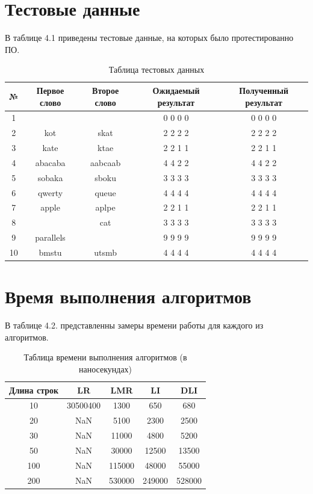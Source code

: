 \documentclass[12pt]{report}
\begin{document}
\section{Тестовые данные}

В таблице 4.1 приведены тестовые данные, на которых было протестированно ПО.

\begin{table}[h]
	\begin{center}
		\begin{tabular}{|c c c c c|} 
			\hline
			№ & Первое слово & Второе слово & Ожидаемый результат & Полученный результат \\ [0.8ex] 
			\hline
			1 &  &  & 0 0 0 0 & 0 0 0 0\\
			\hline
			2 & kot & skat & 2 2 2 2 & 2 2 2 2\\
			\hline
			3 & kate & ktae & 2 2 1 1 & 2 2 1 1\\
			\hline
			4 & abacaba & aabcaab & 4 4 2 2 & 4 4 2 2\\
			\hline
			5 & sobaka & sboku & 3 3 3 3 & 3 3 3 3\\
			\hline
			6 & qwerty & queue & 4 4 4 4 & 4 4 4 4\\
			\hline
			7 & apple & aplpe & 2 2 1 1  & 2 2 1 1\\
			\hline
			8 &  & cat & 3 3 3 3 & 3 3 3 3\\
			\hline
			9 & parallels &  & 9 9 9 9 & 9 9 9 9\\
			\hline
			10 & bmstu & utsmb & 4 4 4 4 & 4 4 4 4\\
			\hline
		\end{tabular}
		\caption{Таблица тестовых данных}
	\end{center}
\end{table}


\section{Время выполнения алгоритмов}

В таблице 4.2. представленны замеры времени работы для каждого из алгоритмов.
\begin{table} [h!]
	\begin{center}
		\begin{tabular}{|c c c c c|} 
		 	\hline
			Длина строк & LR & LMR & LI & DLI \\  
		 	\hline
		 	10 & 30500400 & 1300 & 650 & 680\\
		 	\hline
		 	20 & NaN & 5100 & 2300 & 2500 \\
		 	\hline
			30 & NaN & 11000 & 4800 & 5200 \\
			\hline
			50 & NaN & 30000 & 12500 & 13500 \\
			\hline
			100 & NaN & 115000 & 48000 & 55000\\
			\hline
			200 & NaN & 530000 & 249000 & 528000 \\
			\hline
		\end{tabular}
	\end{center}
	\caption{Таблица времени выполнения алгоритмов (в наносекундах)}
\end{table}
\end{document}
